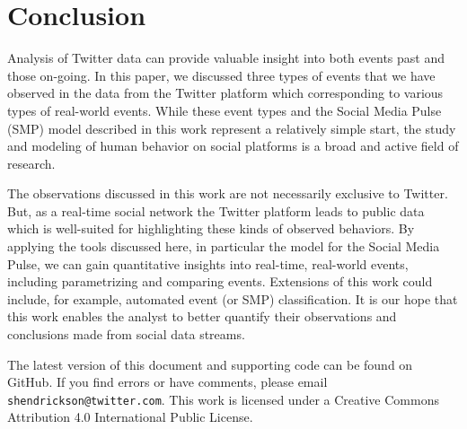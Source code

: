 \documentclass{article}
\begin{document}
\section{Conclusion} 
\label{sec:conclusion}

Analysis of Twitter data can provide valuable insight into both events past and those on-going. In this paper, we discussed three types of events that we have observed in the data from the Twitter platform which corresponding to various types of real-world events. While these event types and the Social Media Pulse (SMP) model described in this work represent a relatively simple start, the study and modeling of human behavior on social platforms is a broad and active field of research. 

The observations discussed in this work are not necessarily exclusive to Twitter. But, as a real-time social network the Twitter platform leads to public data which is well-suited for highlighting these kinds of observed behaviors. By applying the tools discussed here, in particular the model for the Social Media Pulse, we can gain quantitative insights into real-time, real-world events, including parametrizing and comparing events. Extensions of this work could include, for example, automated event (or SMP) classification. It is our hope that this work enables the analyst to better quantify their observations and conclusions made from social data streams. 

The latest version of this document and supporting code can be found on GitHub.\cite{pulse} If you find errors or have comments, please email \texttt{shendrickson@twitter.com}. This work is licensed under a Creative Commons Attribution 4.0 International Public License.\cite{CreativeCommons}


      
 

 
\end{document}
